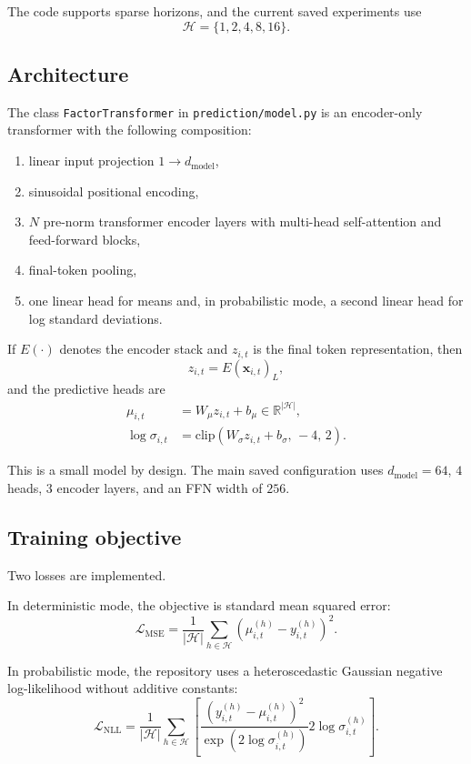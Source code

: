 \documentclass[11pt]{article}
\begin{document}
The code supports sparse horizons, and the current saved experiments use
\[
\mathcal{H} = \{1,2,4,8,16\}.
\]

\subsection{Architecture}
The class \texttt{FactorTransformer} in \texttt{prediction/model.py} is an encoder-only transformer with the following composition:
\begin{enumerate}
\item linear input projection \(1 \rightarrow d_{\mathrm{model}}\),
\item sinusoidal positional encoding,
\item \(N\) pre-norm transformer encoder layers with multi-head self-attention and feed-forward blocks,
\item final-token pooling,
\item one linear head for means and, in probabilistic mode, a second linear head for log standard deviations.
\end{enumerate}

If \(E(\cdot)\) denotes the encoder stack and \(z_{i,t}\) is the final token representation, then
\[
z_{i,t} = E(\mathbf{x}_{i,t})_{L},
\]
and the predictive heads are
\begin{align}
\mu_{i,t} &= W_\mu z_{i,t} + b_\mu \in \mathbb{R}^{|\mathcal{H}|}, \\
\log \sigma_{i,t} &= \mathrm{clip}(W_\sigma z_{i,t} + b_\sigma,\,-4,\,2).
\end{align}

This is a small model by design. The main saved configuration uses \(d_{\mathrm{model}}=64\), \(4\) heads, \(3\) encoder layers, and an FFN width of \(256\).

\subsection{Training objective}
Two losses are implemented.

In deterministic mode, the objective is standard mean squared error:
\[
\mathcal{L}_{\mathrm{MSE}} = \frac{1}{|\mathcal{H}|} \sum_{h \in \mathcal{H}} \left(\mu^{(h)}_{i,t} - y^{(h)}_{i,t}\right)^2.
\]

In probabilistic mode, the repository uses a heteroscedastic Gaussian negative log-likelihood without additive constants:
\[
\mathcal{L}_{\mathrm{NLL}} =
\frac{1}{|\mathcal{H}|} \sum_{h \in \mathcal{H}}
\left[
\frac{\left(y^{(h)}_{i,t} - \mu^{(h)}_{i,t}\right)^2}{\exp(2 \log \sigma^{(h)}_{i,t})}
 2 \log \sigma^{(h)}_{i,t}
\right].
\]
\end{document}
